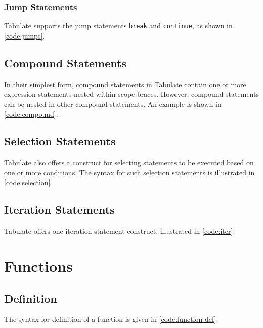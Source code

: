 \documentclass[conference,compsoc]{IEEEtran}
\begin{document}
\subsubsection{Jump Statements}
Tabulate supports the jump statements \texttt{break} and \texttt{continue}, as
shown in \autoref{code:jumps}.



\subsection{Compound Statements}
In their simplest form, compound statements in Tabulate contain one or more
expression statements nested within scope braces. However, compound statements
can be nested in other compound statements. An example is shown in
\autoref{code:compound}.



\subsection{Selection Statements}
Tabulate also offers a construct for selecting statements to be executed based
on one or more conditions. The syntax for such selection statements is
illustrated in \autoref{code:selection}



\subsection{Iteration Statements}
Tabulate offers one iteration statement construct, illustrated in
\autoref{code:iter}.



\section{Functions}

\subsection{Definition}
The syntax for definition of a function is given in \autoref{code:function-def}.
\end{document}
